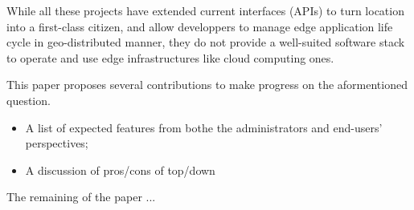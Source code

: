 While all these projects have extended current interfaces (APIs) to
turn location into a first-class citizen, and allow developpers to
manage edge application life cycle in geo-distributed manner, they do not
provide a well-suited software stack to operate and use edge infrastructures like cloud computing ones. 

This paper proposes several
contributions to make progress on the aformentioned question.
\begin{itemize}
\item A list of expected features from bothe the administrators and end-users' perspectives;
\item A discussion of pros/cons of top/down 
\end{itemize}

The remaining of the paper ...







